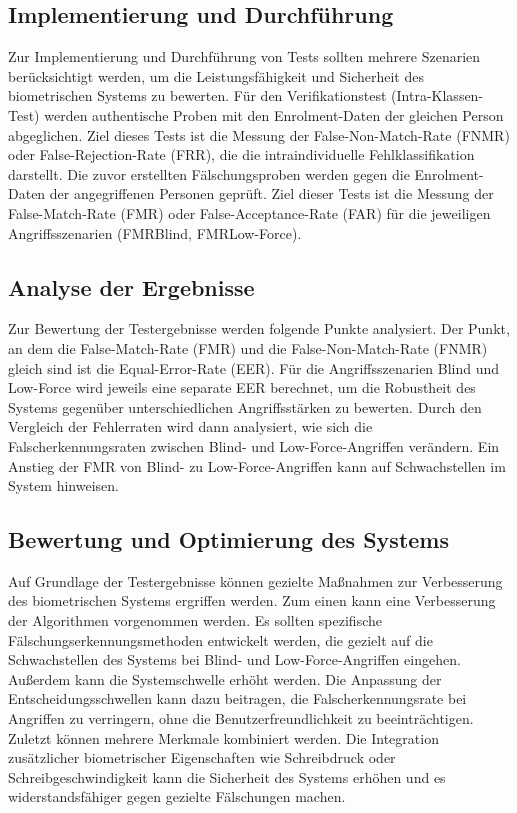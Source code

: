 \documentclass{article}
\begin{document}
\subsection{Implementierung und Durchführung}

Zur Implementierung und Durchführung von Tests sollten mehrere Szenarien berücksichtigt werden, um die Leistungsfähigkeit und Sicherheit des biometrischen Systems zu bewerten. Für den Verifikationstest (Intra-Klassen-Test) werden authentische Proben mit den Enrolment-Daten der gleichen Person abgeglichen. Ziel dieses Tests ist die Messung der False-Non-Match-Rate (FNMR) oder False-Rejection-Rate (FRR), die die intraindividuelle Fehlklassifikation darstellt. Die zuvor erstellten Fälschungsproben werden gegen die Enrolment-Daten der angegriffenen Personen geprüft. Ziel dieser Tests ist die Messung der False-Match-Rate (FMR) oder False-Acceptance-Rate (FAR) für die jeweiligen Angriffsszenarien (FMRBlind, FMRLow-Force).

\subsection{Analyse der Ergebnisse}

Zur Bewertung der Testergebnisse werden folgende Punkte analysiert. Der Punkt, an dem die False-Match-Rate 
(FMR) und die False-Non-Match-Rate (FNMR) gleich sind ist die Equal-Error-Rate (EER). Für die 
Angriffsszenarien Blind und Low-Force wird jeweils eine separate EER berechnet, um die Robustheit des 
Systems gegenüber unterschiedlichen Angriffsstärken zu bewerten. Durch den Vergleich der Fehlerraten wird 
dann analysiert, wie sich die Falscherkennungsraten zwischen Blind- und Low-Force-Angriffen verändern. Ein 
Anstieg der FMR von Blind- zu Low-Force-Angriffen kann auf Schwachstellen im System hinweisen. 

\subsection{Bewertung und Optimierung des Systems}

Auf Grundlage der Testergebnisse können gezielte Maßnahmen zur Verbesserung des biometrischen Systems 
ergriffen werden. Zum einen kann eine Verbesserung der Algorithmen vorgenommen werden. Es sollten 
spezifische Fälschungserkennungsmethoden entwickelt werden, die gezielt auf die Schwachstellen des Systems 
bei Blind- und Low-Force-Angriffen eingehen. Außerdem kann die Systemschwelle erhöht werden. Die Anpassung 
der Entscheidungsschwellen kann dazu beitragen, die Falscherkennungsrate bei Angriffen zu verringern, ohne 
die Benutzerfreundlichkeit zu beeinträchtigen. Zuletzt können mehrere Merkmale kombiniert werden. Die 
Integration zusätzlicher biometrischer Eigenschaften wie Schreibdruck oder Schreibgeschwindigkeit kann die 
Sicherheit des Systems erhöhen und es widerstandsfähiger gegen gezielte Fälschungen machen.
\end{document}
